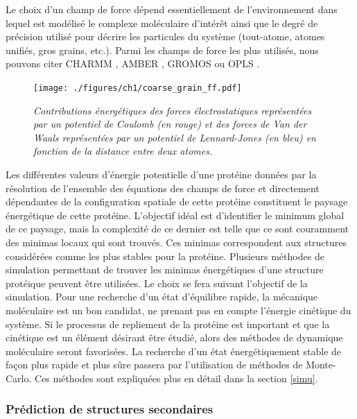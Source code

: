 Le choix d'un champ de force dépend essentiellement de l'environnement dans lequel est modélisé le complexe moléculaire d'intérêt ainsi que le degré de précision utilisé pour décrire les particules du système (tout-atome, atomes unifiés, gros grains, etc.). Parmi les champs de force les plus utilisés, nous pouvons citer CHARMM \cite{brooks2009charmm}, AMBER \cite{pearlman1995amber}, GROMOS \cite{oostenbrink2004biomolecular} ou OPLS \cite{jorgensen1996development}.

\begin{figure}
  \centering
  {\texttt{[image: ./figures/ch1/coarse\_grain\_ff.pdf]}}
    \caption{\it Contributions énergétiques des forces électrostatiques représentées par un potentiel de Coulomb (en rouge) et des forces de Van der Waals représentées par un potentiel de Lennard-Jones (en bleu) en fonction de la distance entre deux atomes.}
    \label{Fig:coarse_grain_ff}
  \hspace{0.3cm}
\end{figure}

Les différentes valeurs d'énergie potentielle d'une protéine données par la résolution de l'ensemble des équations des champs de force et directement dépendantes de la configuration spatiale de cette protéine constituent le paysage énergétique de cette protéine. L’objectif idéal est d'identifier le minimum global de ce paysage, mais la complexité de ce dernier est telle que ce sont couramment des minimas locaux qui sont trouvés. Ces minimas correspondent aux structures considérées comme les plus stables pour la protéine. Plusieurs méthodes de simulation permettant de trouver les minimas énergétiques d'une structure protéique peuvent être utilisées. Le choix se fera suivant l'objectif de la simulation. Pour une recherche d'un état d'équilibre rapide, la mécanique moléculaire est un bon candidat, ne prenant pas en compte l'énergie cinétique du système. Si le processus de repliement de la protéine est important et que la cinétique est un élément désirant être étudié, alors des méthodes de dynamique moléculaire seront favorisées. La recherche d'un état énergétiquement stable de façon plus rapide et plus sûre passera par l'utilisation de méthodes de Monte-Carlo. Ces méthodes sont expliquées plus en détail dans la section \ref{simu}. 

\subsubsection{Prédiction de structures secondaires} \label{prediction_struct_second}

